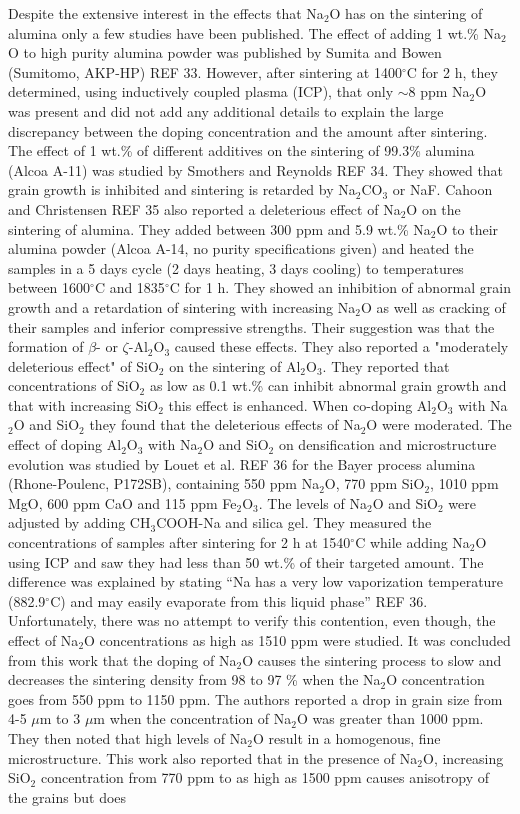 Despite the extensive interest in the effects that Na$_{2}$O has on the sintering of alumina only a few studies have been published. The effect of adding 1 wt.\% Na$_{2}$O to high purity alumina powder was published by Sumita and Bowen (Sumitomo, AKP-HP) REF 33. However, after sintering at 1400$^{\circ}$C for 2 h, they determined, using inductively coupled plasma (ICP), that only $\sim$8 ppm Na$_{2}$O was present and did not add any additional details to explain the large discrepancy between the doping concentration and the amount after sintering. The effect of 1 wt.\% of different additives on the sintering of 99.3\% alumina (Alcoa A-11) was studied by Smothers and Reynolds REF 34. They showed that grain growth is inhibited and sintering is retarded by Na$_{2}$CO$_{3}$ or NaF. Cahoon and Christensen REF 35 also reported a deleterious effect of Na$_{2}$O on the sintering of alumina. They added between 300 ppm and 5.9 wt.\% Na$_{2}$O to their alumina powder (Alcoa A-14, no purity specifications given) and heated the samples in a 5 days cycle (2 days heating, 3 days cooling) to temperatures between 1600$^{\circ}$C and 1835$^{\circ}$C for 1 h. They showed an inhibition of abnormal grain growth and a retardation of sintering with increasing Na$_{2}$O as well as cracking of their samples and inferior compressive strengths. Their suggestion was that the formation of $\beta$- or $\zeta$-Al$_{2}$O$_{3}$ caused these effects. They also reported a "moderately deleterious effect" of SiO$_{2}$ on the sintering of Al$_{2}$O$_{3}$. They reported that concentrations of SiO$_{2}$ as low as 0.1 wt.\% can inhibit abnormal grain growth and that with increasing SiO$_{2}$ this effect is enhanced. When co-doping Al$_{2}$O$_{3}$ with Na$_{2}$O and SiO$_{2}$ they found that the deleterious effects of Na$_{2}$O were moderated. The effect of doping Al$_{2}$O$_{3}$ with Na$_{2}$O and SiO$_{2}$ on densification and microstructure evolution was studied by Louet et al. REF 36 for the Bayer process alumina (Rhone-Poulenc, P172SB), containing 550 ppm Na$_{2}$O, 770 ppm SiO$_{2}$, 1010 ppm MgO, 600 ppm CaO and 115 ppm Fe$_{2}$O$_{3}$. The levels of Na$_{2}$O and SiO$_{2}$ were adjusted by adding CH$_{3}$COOH-Na and silica gel. They measured the concentrations of samples after sintering for 2 h at 1540$^{\circ}$C while adding Na$_{2}$O using ICP and saw they had less than 50 wt.\% of their targeted amount. The difference was explained by stating “Na has a very low vaporization temperature (882.9$^{\circ}$C) and may easily evaporate from this liquid phase” REF 36. Unfortunately, there was no attempt to verify this contention, even though, the effect of Na$_{2}$O concentrations as high as 1510 ppm were studied. It was concluded from this work that the doping of Na$_{2}$O causes the sintering process to slow and decreases the sintering density from 98 to 97 \% when the Na$_{2}$O concentration goes from 550 ppm to 1150 ppm. The authors reported a drop in grain size from 4-5 $\mu$m to 3 $\mu$m when the concentration of Na$_{2}$O was greater than 1000 ppm. They then noted that high levels of Na$_{2}$O result in a homogenous, fine microstructure. This work also reported that in the presence of Na$_{2}$O, increasing SiO$_{2}$ concentration from 770 ppm to as high as 1500 ppm causes anisotropy of the grains but does 